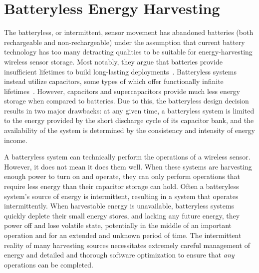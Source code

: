 \section{Batteryless Energy Harvesting}
\label{sec:background:batteryless}
The batteryless, or intermittent, sensor movement has abandoned batteries (both rechargeable and non-rechargeable) under the assumption that current battery technology has too many detracting qualities to be suitable for energy-harvesting wireless sensor storage.
Most notably, they argue that batteries provide insufficient lifetimes to build long-lasting deployments~\cite{hesterTragedy15, hesterFlicker17, hesterTimely17, hester2017future, colinReconfigurable18, luciaIntermittent17, yervaGrafting12, majid2020continuous}.
Batteryless systems instead utilize capacitors, some types of which offer functionally infinite lifetimes~\cite{kemetLife}.
However, capacitors and supercapacitors provide much less energy storage when compared to batteries.
Due to this, the batteryless design decision results in two major drawbacks:
at any given time, a batteryless system is limited to the energy provided by the short discharge cycle of its capacitor bank,
and the availability of the system is determined by the consistency and intensity of energy income.

A batteryless system can technically perform the operations of a wireless sensor.
However, it does not mean it does them well.
When these systems are harvesting enough power to turn on and operate, they can only perform operations that require less energy than their capacitor storage can hold.
Often a batteryless system's source of energy is intermittent, resulting in a system that operates intermittently.
When harvestable energy is unavailable, batteryless systems quickly deplete their
small energy stores, and lacking any future energy,
they power off and lose
volatile state, potentially in the middle of an important operation and for an extended and unknown period of time.
The intermittent reality of many harvesting sources necessitates extremely careful management of energy
and detailed and thorough software optimization
to ensure that \textit{any} operations can be completed.

